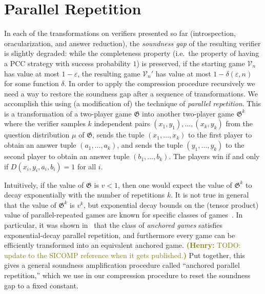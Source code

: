 \documentclass[11pt]{article}
\theoremstyle{definition}
\newcommand{\eps}{\varepsilon}
\newcommand{\game}{\mathfrak{G}}
\newcommand{\sampler}{\mathcal{S}}
\newcommand{\decider}{\mathcal{D}}
\newcommand{\verifier}{\mathcal{V}}
\newcommand{\gamestyle}[1]{\ensuremath{\textsc{#1}}\xspace}
\newcommand{\anch}{\gamestyle{Anch}}
\newcommand{\hnote}[1]{\textcolor{olive}{\small {\textbf{(Henry:} #1\textbf{) }}}}
\newcommand{\hnote}[1]{}
\begin{document}
 
 
\section{Parallel Repetition}
\label{sec:parrep}

\def\tvanch{\hat{\verifier}^\anch}
\def\tdanch{\hat{\decider}^\anch}
\def\tsanch{\hat{\sampler}^\anch}
\def\vanch{\verifier^\anch}
\def\danch{\decider^\anch}
\def\sanch{\sampler^\anch}

In each of the transformations on verifiers presented so far (introspection,
oracularization, and answer reduction), the \emph{soundness gap} of the
resulting verifier is slightly degraded: while the completeness property (i.e.\
the property of having a PCC strategy with success probability $1$) is
preserved, if the starting game $\verifier_n$ has value at most $1 - \eps$, the
resulting game $\verifier_n'$ has value at most $1 - \delta(\eps, n)$ for some
function $\delta$.
In order to apply the compression procedure recursively we need a way to restore
the soundness gap after a sequence of transformations.
We accomplish this using (a modification of) the technique of \emph{parallel
  repetition}.
  This is a transformation of a two-player game $\game$ into another two-player game $\game^k$
  where the verifier samples $k$ independent pairs $(x_1,y_1),\ldots,(x_k,y_k)$ from the
  question distribution $\mu$ of $\game$, sends the tuple $(x_1,\ldots,x_k)$ to the first player
  to obtain an answer tuple $(a_1,\ldots,a_k)$, and sends the tuple $(y_1,\ldots,y_k)$ to the second
  player to obtain an answer tuple $(b_1,\ldots,b_k)$. The players win if and only if $D(x_i,y_i,a_i,b_i) = 1$ 
  for all $i$.  


Intuitively, if the value of $\game$ is $v < 1$, then one would expect the value
of $\game^k$ to decay exponentially with the number of repetitions $k$.
It is not true in general that the value of $\game^k$ is $v^k$, but exponential
decay bounds on the (tensor product) value of parallel-repeated games are known
for specific classes of
games~\cite{jain2014parallel,dinur2015parallel,bavarian2017hardness}.
In particular, it was shown in~\cite{bavarian2017hardness} that the class of
\emph{anchored games} satisfies exponential-decay parallel repetition, and
furthermore every game can be efficiently transformed into an equivalent
anchored game. \hnote{TODO: update to the SICOMP reference when it gets published.}
Put together, this gives a general soundness amplification procedure called
``anchored parallel repetition,'' which we use in our compression procedure to
reset the soundness gap to a fixed constant.
\end{document}
